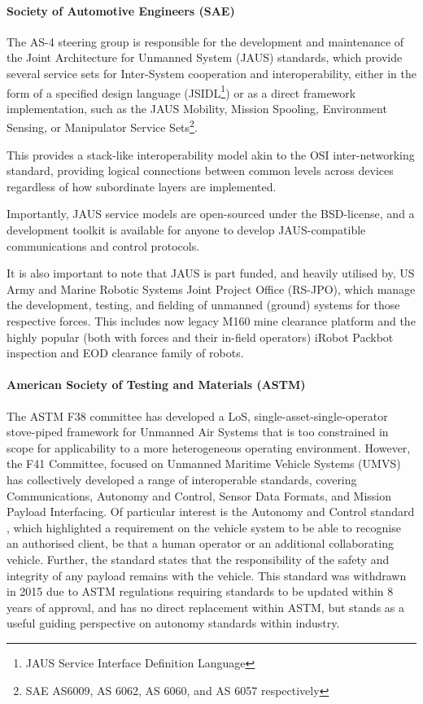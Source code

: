 \paragraph{Society of Automotive Engineers (SAE)}

The AS-4 steering group is responsible for the development and maintenance of the Joint Architecture for Unmanned System (JAUS) standards, which provide several service sets for Inter-System cooperation and interoperability, either in the form of a specified design language (JSIDL\footnote{JAUS Service Interface Definition Language}) or as a direct framework implementation, such as the JAUS Mobility, Mission Spooling, Environment Sensing, or Manipulator Service Sets\footnote{SAE AS6009, AS 6062, AS 6060, and AS 6057 respectively}.

This provides a stack-like interoperability model akin to the OSI inter-networking standard, providing logical connections between common levels across devices regardless of how subordinate layers are implemented.

Importantly, JAUS service models are open-sourced under the BSD-license, and a development toolkit is available for anyone to develop JAUS-compatible communications and control protocols\cite{JTS}. 

It is also important to note that JAUS is part funded, and heavily utilised by, US Army and Marine Robotic Systems Joint Project Office (RS-JPO), which manage the development, testing, and fielding of unmanned (ground) systems for those respective forces. This includes now legacy M160 mine clearance platform and the highly popular (both with forces and their in-field operators) iRobot Packbot inspection and EOD clearance family of robots.


\paragraph{American Society of Testing and Materials (ASTM)}

The ASTM F38 committee has developed a LoS, single-asset-single-operator stove-piped framework for Unmanned Air Systems that is too constrained in scope for applicability to a more heterogeneous operating environment\cite{AmericanSocietyofTestingandMaterials2007}.
However, the F41 Committee, focused on Unmanned Maritime Vehicle Systems (UMVS) has collectively developed a range of interoperable standards, covering Communications, Autonomy and Control, Sensor Data Formats, and Mission Payload Interfacing. Of particular interest is the Autonomy and Control standard \cite{AmericanSocietyofTestingandMaterials2006}, which highlighted a requirement on the vehicle system to be able to recognise an authorised client, be that a human operator or an additional collaborating vehicle. Further, the standard states that the responsibility of the safety and integrity of any payload remains with the vehicle. This standard was withdrawn in 2015 due to ASTM regulations requiring standards to be updated within 8 years of approval, and has no direct replacement within ASTM, but stands as a useful guiding perspective on autonomy standards within industry.

